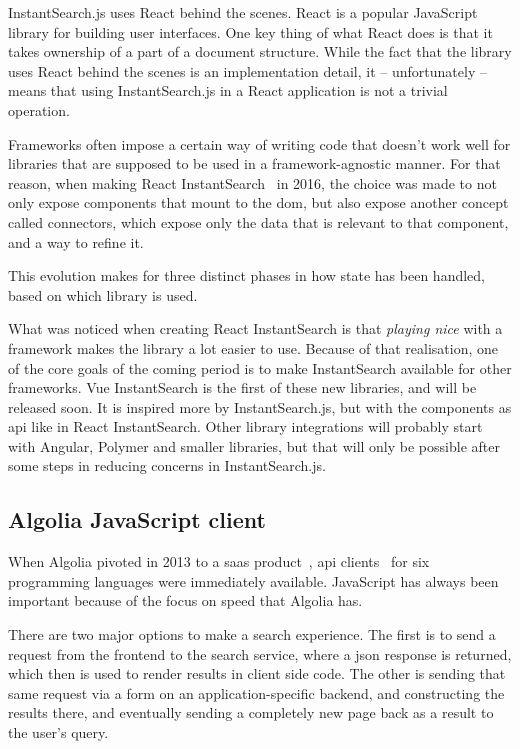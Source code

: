 InstantSearch.js uses React behind the scenes. React\cite{react-doc} is a popular JavaScript \gls{library} for building user interfaces. One key thing of what React does is that it takes ownership of a part of a document structure. While the fact that the \gls{library} uses React behind the scenes is an implementation detail, it -- unfortunately -- means that using InstantSearch.js in a React application is not a trivial operation.

Frameworks often impose a certain way of writing code that doesn't work well for libraries that are supposed to be used in a framework-agnostic manner. For that reason, when making React InstantSearch~\cite{react-instantsearch} in 2016, the choice was made to not only expose components that mount to the \acrshort{dom}, but also expose another concept called connectors, which expose only the data that is relevant to that component, and a way to refine it.

This evolution makes for three distinct phases in how state has been handled, based on which \gls{library} is used.

What was noticed when creating React InstantSearch is that \emph{playing nice} with a framework makes the library a lot easier to use. Because of that realisation, one of the core goals of the coming period is to make InstantSearch available for other frameworks. Vue InstantSearch is the first of these new libraries, and will be released soon. It is inspired more by InstantSearch.js, but with the components as \acrshort{api} like in React InstantSearch. Other library integrations will probably start with Angular, Polymer and smaller libraries, but that will only be possible after some steps in reducing concerns in InstantSearch.js.

\subsection{Algolia JavaScript client} %
\label{sub:algolia_js_client}

When Algolia pivoted in 2013 to a \acrshort{saas} product~\cite{algolia-blog-saas}, \acrshort{api} clients~\cite{algolia-blog-lauch} for six programming languages were immediately available. JavaScript has always been important because of the focus on speed that Algolia has.

There are two major options to make a search experience. The first is to send a request from the frontend to the search service, where a \acrshort{json} response is returned, which then is used to render results in client side code. The other is sending that same request via a form on an application-specific backend, and constructing the results there, and eventually sending a completely new page back as a result to the user's query.

